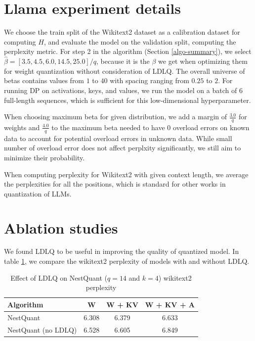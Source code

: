 \documentclass{article}
\newif\ifisicml
\theoremstyle{plain}
\theoremstyle{definition}
\theoremstyle{remark}
\begin{document}
\section{Llama experiment details}

\label{sec:hyperparams}

We choose the train split of the Wikitext2 \cite{merity2016pointer} dataset as a calibration dataset for computing $H$, and evaluate the model on the validation split, computing the perplexity metric. For step 2 in the algorithm (Section \ref{algo-summary}), we select $\hat{\beta} = [3.5, 4.5, 6.0, 14.5, 25.0]/q$, because it is the $\beta$ we get when optimizing them for weight quantization without consideration of LDLQ. The overall universe of betas contains values from $1$ to $40$ with spacing ranging from $0.25$ to $2$. For running DP on activations, keys, and values, we run the model on a batch of $6$ full-length sequences, which is sufficient for this low-dimensional hyperparameter.

When choosing maximum beta for given distribution, we add a margin of $\frac{3.0}{q}$ for weights and $\frac{4.0}{q}$ to the maximum beta needed to have $0$ overload errors on known data to account for potential overload errors in unknown data. While small number of overload error does not affect perplxity significantly, we still aim to minimize their probability.

When computing perplexity for Wikitext2 with given context length, we average the perplexities for all the positions, which is standard for other works in quantization of LLMs.

\section{Ablation studies}

\label{sec:ablation}

We found LDLQ to be useful in improving the quality of quantized model. In table \ref{tab:ldlq_ppl}, we compare the wikitext2 perplexity of models with and without LDLQ.

\begin{table}[h]
\centering
\scriptsize
\begin{tabular}{lccc}
    \toprule
Algorithm &  \textbf{W}&
\textbf{W + KV}&
\textbf{W + KV + A}\\    \midrule
    NestQuant & 6.308& 6.379& 6.633\\
    NestQuant (no LDLQ) & 6.528& 6.605& 6.849 \\
    \bottomrule
\end{tabular}
\ifisicml\else\vspace{1em}\fi
\caption{Effect of LDLQ on NestQuant ($q=14$ and $k=4$) wikitext2 perplexity} 
\label{tab:ldlq_ppl}
\end{table}
\end{document}
